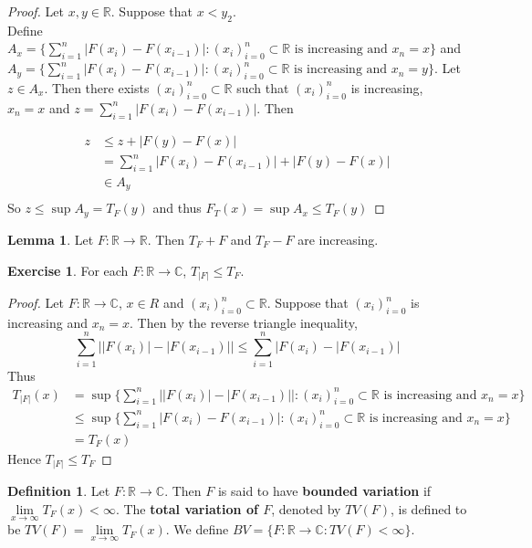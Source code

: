 \documentclass[12pt]{amsart}
\theoremstyle{definition}
\newtheorem{defn}[definition]{Definition}
\newtheorem{lem}[definition]{Lemma}
\newtheorem{ex}[definition]{Exercise}
\newcommand{\C}{\mathbb{C}}
\newcommand{\R}{\mathbb{R}}
\begin{document}
	\begin{proof}
		Let $x,y \in \R$. Suppose that $x<y_2$. \\Define  $A_x = \big \{\sum_{i=1}^{n}|F(x_{i}) - F(x_{i-1})|: (x_i)_{i=0}^n \subset \R \text{ is increasing and } x_n=x  \big \}$ and \\$A_y = \big \{\sum_{i=1}^{n}|F(x_{i}) - F(x_{i-1})|: (x_i)_{i=0}^n \subset \R \text{ is increasing and } x_n=y  \big \}$. Let $z \in A_x$. Then there exists $(x_i)_{i=0}^n \subset \R$ such that $(x_i)_{i=0}^n$ is increasing,\\ $x_n=x$ and $z = \sum_{i=1}^n |F(x_{i}) - F(x_{i-1})|$. Then
		
		\begin{align*}
			z 
			& \leq z+|F(y)-F(x)|\\
			&= \sum_{i=1}^n |F(x_{i}) - F(x_{i-1})| + |F(y)-F(x)|\\
			& \in A_y\\
		\end{align*} 
		So $z \leq \sup A_y = T_F(y) $ and thus $F_T(x)  = \sup A_x \leq T_F(y)$
	\end{proof}
	
	\begin{lem}
		Let $F:\R \rightarrow \R$. Then $T_F+F$ and $T_F-F$ are increasing.
	\end{lem}
	
	\begin{ex}
		For each $F:\R \rightarrow \C$, $T_{|F|} \leq T_F$.
	\end{ex}
	
	\begin{proof}
		Let $F:\R \rightarrow \C$, $x \in R$ and $(x_i)_{i=0}^n \subset \R$. Suppose that $(x_i)_{i=0}^n$ is increasing and $x_n=x$. Then by the reverse triangle inequality, $$ \sum_{i=1}^n\big||F(x_i)|-|F(x_{i-1})|\big|
		\leq \sum_{i=1}^n\big|F(x_i)-|F(x_{i-1})\big|$$
		Thus 
		\begin{align*}
			T_{|F|}(x) 
			&= \sup\bigg \{\sum_{i=1}^{n}\big||F(x_{i})| - |F(x_{i-1})|\big|: (x_i)_{i=0}^n \subset \R \text{ is increasing and } x_n=x  \bigg \} \\
			& \leq \sup\bigg \{\sum_{i=1}^{n}|F(x_{i}) - F(x_{i-1})|: (x_i)_{i=0}^n \subset \R \text{ is increasing and } x_n=x  \bigg \} \\
			&= T_F(x)
		\end{align*}
		Hence $T_{|F|} \leq T_F$
	\end{proof}
	
	\begin{defn}
		Let $F:\R \rightarrow \C$. Then $F$ is said to have \textbf{bounded variation} if $\lim \limits_{x \rightarrow \infty}T_F(x)<\infty$. The \textbf{total variation of $F$}, denoted by $TV(F)$, is defined to be $TV(F) = \lim\limits_{x\rightarrow \infty}T_F(x)$.
		We define $BV = \{F:\R \rightarrow \C: TV(F)<\infty \}$.
	\end{defn}
	
\end{document}
